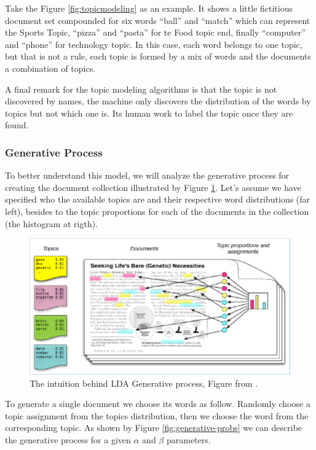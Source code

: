 	Take the Figure \ref{fig:topicmodeling} as an example. It shows a little fictitious document set compounded for six words ``ball'' and ``match'' which can represent the Sports Topic, ``pizza'' and ``pasta'' for te Food topic end, finally ``computer'' and ``phone'' for technology topic. In this case, each word belongs to one topic, but that is not a rule, each topic is formed by a mix of words and the documents a combination of topics.
		
	A final remark for the topic modeling algorithms is that the topic is not discovered by names, the machine only discovers the distribution of the words by topics but not which one is. Its human work to label the topic once they are found.
	
	\subsubsection{Generative Process}
	
	To better understand this model, we will analyze the generative process for creating the document collection illustrated by Figure \ref{fig:lda-generative-process}. Let's assume we have specified who the available topics are and their respective word distributions (far left), besides to the topic proportions for each of the documents in the collection (the histogram at rigth). 
		
	\begin{figure}[h!]
		\centering
		\includegraphics[width=\linewidth]{01.Chapters/02.Background/The-intuition-behind-LDA-Generative-process-by-D-Blei-17}
		\caption{The intuition behind LDA Generative process, Figure from  \cite{blei2012probabilistic}.}
		\label{fig:lda-generative-process}
	\end{figure}
	
	To generate a single document we choose its words as follow. Randomly choose a topic assignment from the topics distribution, then we choose the word from the corresponding topic. As shown by Figure \ref{fig:generative-probs} we can describe the generative process for a given $\alpha$ and $\beta$ parameters.
	
